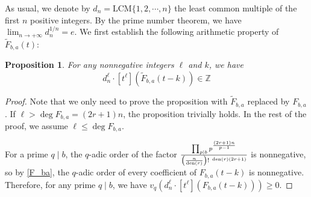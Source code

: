 \documentclass[11pt]{amsart}
\newtheorem{proposition}[theorem]{Proposition}
\numberwithin{equation}{section}
\begin{document}
As usual, we denote by $d_n=\text{LCM}\{1,2,\cdots,n\}$ the least common multiple of the first $n$ positive integers. By the prime number theorem, we have $\lim_{n \rightarrow +\infty} d_n^{1/n} = e$. We first establish the following arithmetic property of $\widetilde{F}_{b,a}(t)$:

\smallskip
\begin{proposition}\label{AriF}
For any nonnegative integers $\ell$ and $k$, we have
\[d_{n}^{\ell} \cdot [t^{\ell}](\widetilde{F}_{b,a}(t-k)) \in \mathbb{Z} \]
\end{proposition}

\begin{proof}
Note that we only need to prove the proposition with $\widetilde{F}_{b,a}$ replaced by $F_{b,a}$. If $\ell > \deg F_{b,a} =(2r+1)n$, the proposition trivially holds. In the rest of the proof, we assume $\ell \leq \deg F_{b,a}$.

For a prime $q \mid b$, the $q$-adic order of the factor $\frac{\prod_{p \mid b} p^{\frac{(2r+1)n}{p-1}}}{\left( \frac{n}{{\rm den}(r)} \right)!~^{{\rm den}(r)(2r+1)}}$ is nonnegative, so by \eqref{F_ba}, the $q$-adic order of every coefficient of $F_{b,a}(t-k)$ is nonnegative. Therefore, for any prime $q \mid b$, we have $v_q( d_{n}^{\ell} \cdot [t^{\ell}](F_{b,a}(t-k))) \geqslant 0$.


\end{proof}
\end{document}

